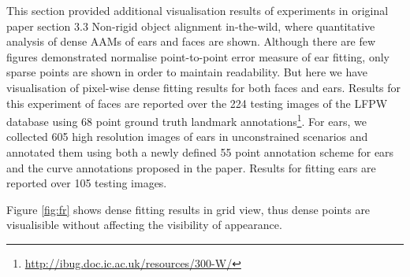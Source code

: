 This section provided additional visualisation results of experiments in original paper section 3.3 Non-rigid object alignment in-the-wild, where quantitative analysis of dense AAMs of ears and faces are shown. Although there are few figures demonstrated normalise point-to-point error measure of ear fitting, only sparse points are shown in order to maintain readability. But here we have visualisation of pixel-wise dense fitting results for both faces and ears. Results for this experiment of faces are reported over the 224 testing images of the LFPW database using 68 point ground truth landmark annotations\footnote{\label{ibug_300} \url{http://ibug.doc.ic.ac.uk/resources/300-W/}}. For ears, we collected 605 high resolution images of ears in unconstrained scenarios and annotated them using both a newly defined 55 point annotation scheme for ears and the curve annotations proposed in the paper. Results for fitting ears are reported over 105 testing images.

Figure \ref{fig:fr} shows dense fitting results in grid view, thus dense points are visualisible without affecting the visibility of appearance.

